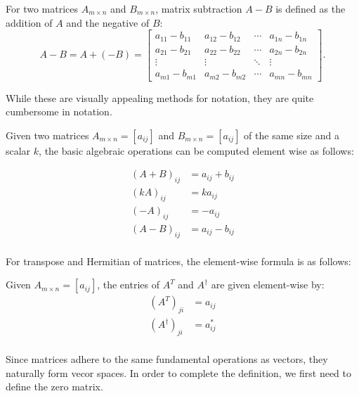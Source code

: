 \documentclass[12pt]{article}
\begin{document}
\begin{definition}
    For two matrices $A_{m \times n}$ and $B_{m \times n}$, matrix subtraction $A - B$ is defined as the addition of $A$ and the negative of $B$:
    \[
    A - B = A + (-B) =
    \begin{bmatrix}
    a_{11} - b_{11} & a_{12} - b_{12} & \cdots & a_{1n} - b_{1n} \\
    a_{21} - b_{21} & a_{22} - b_{22} & \cdots & a_{2n} - b_{2n} \\
    \vdots          & \vdots          & \ddots & \vdots          \\
    a_{m1} - b_{m1} & a_{m2} - b_{m2} & \cdots & a_{mn} - b_{mn}
    \end{bmatrix}.
    \]
\end{definition}

While these are visually appealing methods for notation, they are quite cumbersome in notation. 

\begin{theorem}
    Given two matrices $A_{m \times n} = [a_{ij}]$ and $B_{m \times n} = [a_{ij}]$ of the same size and a scalar $k$, the basic algebraic operations can be computed element wise as follows:

    \begin{align*}
        (A + B)_{ij} &= a_{ij} + b_{ij} \\
        (kA)_{ij} &= ka_{ij} \\
        (-A)_{ij} &= -a_{ij} \\
        (A - B)_{ij} &= a_{ij} - b_{ij}\\
    \end{align*}
\end{theorem}

For transpose and Hermitian of matrices, the element-wise formula is as follows: 

\begin{theorem}
    Given $A_{m \times n} = [a_{ij}]$, the entries of $A^T$ and $A^\dagger$ are given element-wise by:
    \begin{align*}
        (A^T)_{ji} &= a_{ij} \\
        (A^\dagger)_{ji} &= a^*_{ij} \\
    \end{align*}
\end{theorem}

Since matrices adhere to the same fundamental operations as vectors, they naturally form vecor spaces. In order to complete the definition, we first need to define the zero matrix. 
\end{document}
